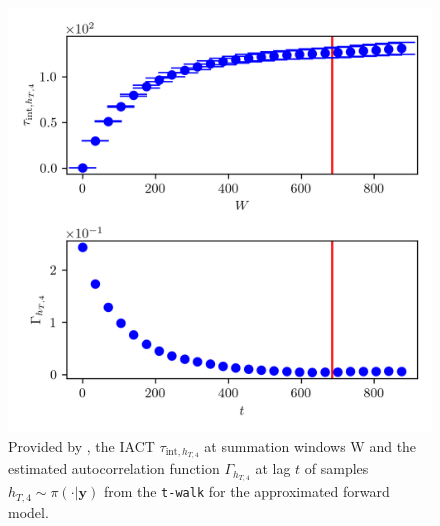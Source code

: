 \begin{figure}[ht!]
	\centering
	\includegraphics{UwerrTauIntTWalk12.png}
	\caption[IACT and autocorrelation function of samples $h_{T,4} \sim \pi(\cdot|\bm{y})$, for approximated model.]{Provided by \cite{drikHesse}, the IACT $\tau_{\text{int},h_{T,4}}$ at summation windows W and the estimated autocorrelation function $\Gamma_{h_{T,4}}$ at lag $t$ of samples $h_{T,4} \sim \pi( \cdot| \bm{y})$ from the \texttt{t-walk} for the approximated forward model.}
	\label{fig:TWalkIATC13}
\end{figure}
